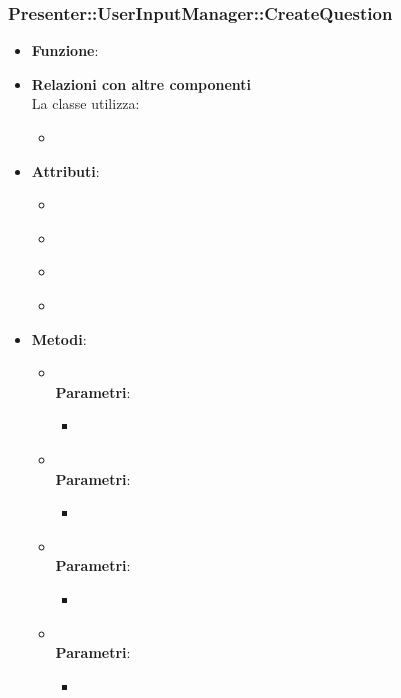 \subsubsection{Presenter::UserInputManager::CreateQuestion}
\begin{itemize}
\item\textbf{Funzione}:
\item\textbf{Relazioni con altre componenti}\\
La classe utilizza:
	\begin{itemize}
		\item
	\end{itemize}
\item\textbf{Attributi}:
	\begin{itemize}
		\item\code{}\\
		\item\code{}\\
		\item\code{}\\
		\item\code{}\\
	\end{itemize}
\item\textbf{Metodi}:
	\begin{itemize}
		\item\code{}\\
		\textbf{Parametri}:
			\begin{itemize}
				\item\code{}\\
			\end{itemize}
		\item\code{}\\
		\textbf{Parametri}:
			\begin{itemize}
				\item\code{}\\
			\end{itemize}
		\item\code{}\\
		\textbf{Parametri}:
			\begin{itemize}
				\item\code{}\\
			\end{itemize}
		\item\code{}\\
		\textbf{Parametri}:
			\begin{itemize}
				\item\code{}\\
			\end{itemize}
	\end{itemize}
\end{itemize}

